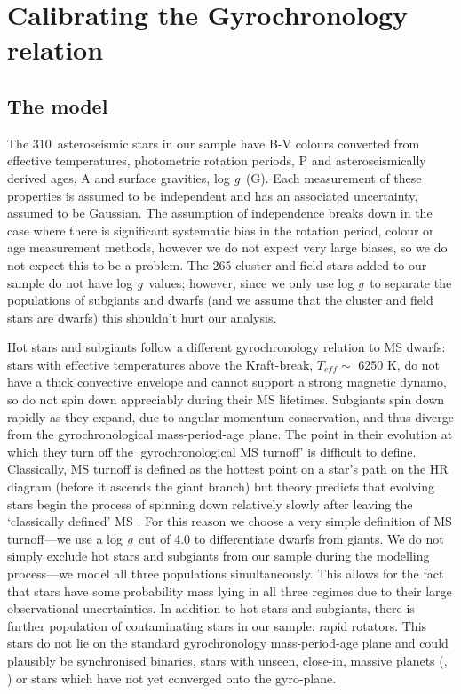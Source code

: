 \documentclass[10pt,preprint]{aastex}
\newcommand{\logg}{log \emph{g}~}
\newcommand{\nastero}{310~}
\begin{document}
\section{Calibrating the Gyrochronology relation}
\label{sec:gyro_cal}

\subsection{The model}

The \nastero asteroseismic stars in our sample have B-V colours converted from effective temperatures, photometric rotation periods, P and asteroseismically derived ages, A and surface gravities, \logg (G).
Each measurement of these properties is assumed to be independent and has an associated uncertainty, assumed to be Gaussian.
The assumption of independence breaks down in the case where there is significant systematic bias in the rotation period, colour or age measurement methods, however we do not expect very large biases, so we do not expect this to be a problem.
The 265 cluster and field stars added to our sample do not have \logg values; however, since we only use \logg to separate the populations of subgiants and dwarfs (and we assume that the cluster and field stars are dwarfs) this shouldn't hurt our analysis.

Hot stars and subgiants follow a different gyrochronology relation to MS dwarfs: stars with effective temperatures above the Kraft-break, $T_{eff} \sim$ 6250 K, \citep{Kraft1967} do not have a thick convective envelope and cannot support a strong magnetic dynamo, so do not spin down appreciably during their MS lifetimes.
Subgiants spin down rapidly as they expand, due to angular momentum conservation, and thus diverge from the gyrochronological mass-period-age plane.
The point in their evolution at which they turn off the `gyrochronological MS turnoff' is difficult to define.
Classically, MS turnoff is defined as the hottest point on a star's path on the HR diagram (before it ascends the giant branch) but theory predicts that evolving stars begin the process of spinning down relatively slowly after leaving the `classically defined' MS \citep{vanSaders2013}.
For this reason we choose a very simple definition of MS turnoff---we use a \logg cut of 4.0 to differentiate dwarfs from giants.
We do not simply exclude hot stars and subgiants from our sample during the modelling process---we model all three populations simultaneously.
This allows for the fact that stars have some probability mass lying in all three regimes due to their large observational uncertainties.
In addition to hot stars and subgiants, there is further population of contaminating stars in our sample: rapid rotators.
This stars do not lie on the standard gyrochronology mass-period-age plane and could plausibly be synchronised binaries, stars with unseen, close-in, massive planets (\citet{Poppenhaeger2014}, \citet{Beky2014}) or stars which have not yet converged onto the gyro-plane.
\end{document}
